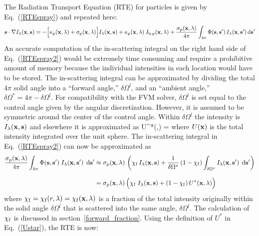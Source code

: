 The Radiation Transport Equation (RTE) for particles is given by Eq.~(\ref{RTEspray}) and repeated here:
\begin{equation}
\mathbf{s} \cdot \nabla I_{\lambda}(\mathbf{x},\mathbf{s}) = -\Big[ \kappa_{\rm p}(\mathbf{x},\lambda) + \sigma_{\rm p}(\mathbf{x},\lambda) \Big]
I_{\lambda}(\mathbf{x},\mathbf{s}) +\kappa_{\rm p}(\mathbf{x},\lambda) \; I_{{\rm b,p}}(\mathbf{x},\lambda) +
\frac{\sigma_{\rm p}(\mathbf{x},\lambda)}{4\pi}
\int_{4\pi}\Phi(\mathbf{s},\mathbf{s}') \, I_{\lambda}(\mathbf{x},\mathbf{s}') \, \rm d\mathbf{s}' \label{RTEspray2}
\end{equation}
An accurate computation of the in-scattering integral on the right hand side of Eq.~(\ref{RTEspray2}) would be extremely time consuming and require a prohibitive amount of memory because the individual intensities in each location would have to be stored. The in-scattering integral can be approximated by dividing the total $4\pi$ solid angle into a ``forward angle,'' $\delta\Omega^l$, and an ``ambient angle,'' $\delta\Omega^*=4\pi - \delta\Omega^l$.  For compatibility with the FVM solver, $\delta\Omega^l$ is set equal to the control angle given by the angular discretization.  However, it is assumed to be symmetric around the center of the control angle.  Within $\delta\Omega^l$ the intensity is $I_{\lambda}({\mathbf{x}},{\mathbf{s}})$ and elsewhere it is approximated as
\be
\label{Ustar}
U^*(\bx,\la) = 
\ee
where $U({\mathbf{x}})$ is the total intensity integrated over the unit sphere. The in-scattering integral in Eq.~(\ref{RTEspray2}) can now be approximated as
\begin{align}
\notag \frac{\sigma_{\rm p}({\mathbf{x}},\lambda)}{4\pi}\int_{4\pi}\Phi({\mathbf{s}},{\mathbf{s}}') \; I_{\lambda}({\mathbf{x}},{\mathbf{s}}')
  \; \,\mathrm{d}{\mathbf{s}}'
  &\approx
\sigma_{\rm p}({\mathbf{x}},\lambda) \, \left( \chi_{\rm f} \, I_{\lambda}({\mathbf{x}},{\mathbf{s}}) + \frac{1}{\delta\Omega^{*}} \left(1-\chi_{\rm f}\right)
\int_{\delta\Omega^{*}} I_{\lambda}({\mathbf{x}},{\mathbf{s}}') \; \,\mathrm{d} {\mathbf{s}}' \right)\\[0.1in]
  &=
\sigma_{\rm p}({\mathbf{x}},\lambda) \, \Big( \chi_{\rm f} \; I_{\lambda}({\mathbf{x}},{\mathbf{s}}) +
(1-\chi_{\rm f}) \, U^*({\mathbf{x}},\lambda) \Big)
\label{SprayRTE_RHS}
\end{align}
where $\chi_{\rm f} = \chi_{\rm f}(r,\lambda)=\chi_{\rm f}({\mathbf{x}},\lambda)$ is a fraction of the total intensity originally within the solid angle $\delta\Omega^l$ that is scattered
into the same angle, $\delta\Omega^l$. The calculation of $\chi_{\rm f}$ is discussed in section~\ref{forward_fraction}. Using the definition of $U^*$ in Eq.~(\ref{Ustar}), the RTE is now:
